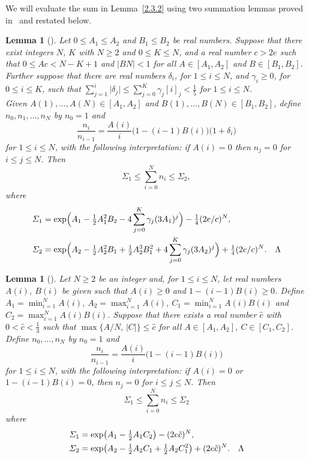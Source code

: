 \documentclass[12pt]{article}
\newtheorem{lemma}[theorem]{Lemma}
\numberwithin{equation}{section}
\def\({\bigl(}   \def\){\bigr)}
\def\abs#1{\mathopen|#1\mathclose|} \let\card=\abs
\def\ff#1#2{[#1]_{#2}}
\begin{document}
We will evaluate the sum in Lemma~\ref{2.3.2} 
using two summation lemmas proved in~\cite{GMW} and restated below.

\begin{lemma}[{\cite[Corollary 4.3]{GMW}}]\label{sumcor}
Let $0\leq A_1\leq A_2$ and $B_1\leq B_2$ be real numbers.
Suppose that there exist integers $N$, $K$ with
$N\geq 2$ and  $0\leq K\leq N$, and a real number
$c> 2e$ such that $0\leq Ac<N-K+1$ and $\abs{BN}<1$
for all $A\in[A_1,A_2]$ and $B\in[B_1,B_2]$. 
Further suppose that there are real numbers $\delta_i$, for $1\le i\le N$,
and\/ $\gamma_i\ge 0$,  for $0\le i\le K$, such that\/
$\sum_{j=1}^i \abs{\delta_j}\le \sum_{j=0}^K\gamma_j\ff ij<\tfrac15$
for\/ $1\le i\le N$.\\
Given $A(1),\ldots,A(N)\in[A_1,A_2]$ and
$B(1),\ldots,B(N)\in[B_1,B_2]$,
define $n_0,n_1,\ldots,n_N$ by $n_0=1$ and
$$\frac{n_i}{n_{i-1}} = \frac {A(i)}i \(1 - (i-1)B(i)\)\(1+\delta_i)$$
for\/ $1\le i\le N$, with the following interpretation: if $A(i)=0$
then $n_j=0$ for $i\leq j\leq N$. 
Then  $$\varSigma_1 \le \sum_{i=0}^N n_i\le \varSigma_2,$$
where
\begin{align*}
 \varSigma_1 &= \exp\Bigl( A_1 - \tfrac12 A_1^2B_2 
     - 4 \sum_{j=0}^K\gamma_j(3A_1)^j\Bigr) - \tfrac14 (2e/c)^N,\\
 \varSigma_2 &= \exp\Bigl( A_2 - \tfrac12 A_2^2B_1 
 + \tfrac12 A_2^3B_1^2
     + 4 \sum_{j=0}^K\gamma_j(3A_2)^j\Bigr) + \tfrac14 (2e/c)^N.
     \quad\qedsymbol
\end{align*}
\end{lemma}


\begin{lemma}[{\cite[Corollary 4.5]{GMW}}]\label{sumcor2}
Let $N\geq 2$ be an integer and, for $1\leq i\leq N$, let real
numbers $A(i)$, $B(i)$ be given such that $A(i)\geq 0$ and
$1-(i-1)B(i) \ge 0$.
Define 
$A_1 = \min_{i=1}^N A(i)$, $A_2 = \max_{i=1}^N A(i)$,
$C_1 = \min_{i=1}^N A(i)B(i)$ and $C_2=\max_{i=1}^N A(i)B(i)$.
Suppose that there exists a real number $\hat{c}$ with 
$0<\hat{c} < \tfrac{1}{3}$ such that 
$\max\{ A/N,\, \abs{C}\} \leq \hat{c}$ 
for all $A\in [A_1,A_2]$,  $C\in [C_1,C_2]$.
Define $n_0,\ldots ,n_N$ by $n_0=1$ and
\[ \frac{n_i}{n_{i-1}} = \frac{A(i)}{i}\(1-(i-1)B(i)\)\]
for $1\leq i\leq N$, with the following interpretation: if $A(i)=0$
or $1-(i-1)B(i)=0$, then $n_j=0$ for $i\leq j\leq N$.  Then
\[ \varSigma_1 \leq \sum_{i=0}^N n_i\leq \varSigma_2\]
where
\begin{align*}
 \varSigma_1 &= \exp\( A_1 - \tfrac{1}{2} A_1 C_2 \)
               - (2e\hat{c})^N,\\
 \varSigma_2 &= \exp\( A_2 - \tfrac{1}{2} A_2 C_1 +
              \tfrac12 A_2 C_1^2 \) + (2e\hat{c})^N.
     \quad\qedsymbol
\end{align*}
\end{lemma}
\end{document}

